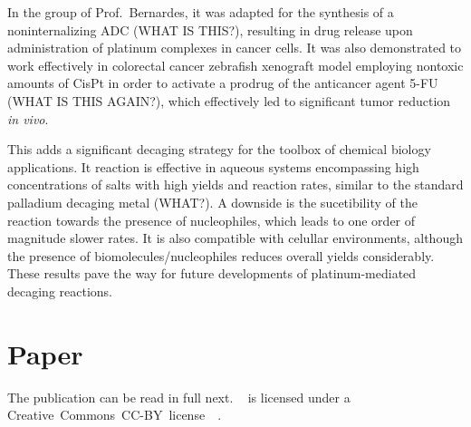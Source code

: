 In the group of Prof.~Bernardes, it was adapted for the synthesis of a
noninternalizing ADC (WHAT IS THIS?), resulting in drug release upon
administration of platinum complexes in cancer cells.
It was also demonstrated to work effectively in colorectal cancer zebrafish
xenograft model employing nontoxic amounts of CisPt in order to activate a
prodrug of the anticancer agent 5-FU (WHAT IS THIS AGAIN?), which effectively
led to significant tumor reduction \emph{in vivo}.

This adds a significant decaging strategy for the toolbox of chemical biology
applications.
It reaction is effective in aqueous systems encompassing high concentrations of
salts with high yields and reaction rates, similar to the standard palladium
decaging metal (WHAT?).
A downside is the sucetibility of the reaction towards the presence of
nucleophiles, which leads to one order of magnitude slower rates.
It is also compatible with celullar environments, although the presence of
biomolecules/nucleophiles reduces overall yields considerably.
These results pave the way for future developments of platinum-mediated
decaging reactions.

\section{Paper}

The publication can be read in full next.
\citeauthor{Oliveira_2020}~\cite{Oliveira_2020}
is licensed under a
Creative~Commons~CC-BY~license~\ccby~\cite{ACS_CCBY_2014}.


